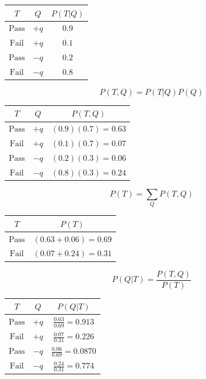 \documentclass[12pt]{article}
\begin{document}
\begin{enumerate}
\begin{center}
  \begin{tabular}{|c|c|c|}
    \hline
    $T$ & $Q$ & $P(T|Q)$ \\
    \hline
    $\text{Pass}$ & $+q$ & $0.9$ \\
    \hline
    $\text{Fail}$ & $+q$ & $0.1$ \\
    \hline
    $\text{Pass}$ & $-q$ & $0.2$ \\
    \hline
    $\text{Fail}$ & $-q$ & $0.8$ \\
    \hline
  \end{tabular}
\end{center}

\[
  P(T,Q) = P(T|Q)P(Q)
\]

\begin{center}
  \begin{tabular}{|c|c|c|}
    \hline
    $T$ & $Q$ & $P(T,Q)$ \\
    \hline
    $\text{Pass}$ & $+q$ & $(0.9)(0.7) = 0.63$ \\
    \hline
    $\text{Fail}$ & $+q$ & $(0.1)(0.7) = 0.07$ \\
    \hline
    $\text{Pass}$ & $-q$ & $(0.2)(0.3) = 0.06$ \\
    \hline
    $\text{Fail}$ & $-q$ & $(0.8)(0.3) = 0.24$ \\
    \hline
  \end{tabular}
\end{center}

\[
  P(T) = \sum_Q{P(T,Q)}
\]

\begin{center}
  \begin{tabular}{|c|c|}
    \hline
    $T$ & $P(T)$ \\
    \hline
    $\text{Pass}$ & $(0.63+0.06) = 0.69$ \\
    \hline
    $\text{Fail}$ & $(0.07+0.24) = 0.31$ \\
    \hline
  \end{tabular}
\end{center}

\[
  P(Q|T) = \frac{P(T,Q)}{P(T)}
\]

\begin{center}
  \begin{tabular}{|c|c|c|}
    \hline
    $T$ & $Q$ & $P(Q|T)$ \\
    \hline
    $\text{Pass}$ & $+q$ & $\frac{0.63}{0.69} = 0.913$ \\
    \hline
    $\text{Fail}$ & $+q$ & $\frac{0.07}{0.31} = 0.226$ \\
    \hline
    $\text{Pass}$ & $-q$ & $\frac{0.06}{0.69} = 0.0870$ \\
    \hline
    $\text{Fail}$ & $-q$ & $\frac{0.24}{0.31} = 0.774$ \\
    \hline
  \end{tabular}
\end{center}


\end{enumerate}
\end{document}
